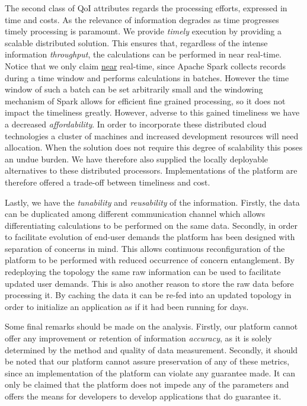 The second class of QoI attributes regards the processing efforts, expressed in time and costs. As the relevance of information degrades as time progresses timely processing is paramount. We provide \emph{timely} execution by providing a scalable distributed solution. This ensures that, regardless of the intense information \emph{throughput}, the calculations can be performed in near real-time. Notice that we only claim \underline{near} real-time, since Apache Spark collects records during a time window and performs calculations in batches. However the time window of such a batch can be set arbitrarily small and the windowing mechanism of Spark allows for efficient fine grained processing, so it does not impact the timeliness greatly. However, adverse to this gained timeliness we have a decreased \emph{affordability}. In order to incorporate these distributed cloud technologies a cluster of machines and increased development resources will need allocation. When the solution does not require this degree of scalability this poses an undue burden. We have therefore also supplied the locally deployable alternatives to these distributed processors. Implementations of the platform are therefore offered a trade-off between timeliness and cost.
	
Lastly, we have the \emph{tunability} and \emph{reusability} of the information. Firstly, the data can be duplicated among different communication channel which allows differentiating calculations to be performed on the same data. Secondly, in order to facilitate evolution of end-user demands the platform has been designed with separation of concerns in mind. This allows continuous reconfiguration of the platform to be performed with reduced occurrence of concern entanglement. By redeploying the topology the same raw information can be used to facilitate updated user demands. This is also another reason to store the raw data before processing it. By caching the data it can be re-fed into an updated topology in order to initialize an application as if it had been running for days.

Some final remarks should be made on the analysis. Firstly, our platform cannot offer any improvement or retention of information \emph{accuracy}, as it is solely determined by the method and quality of data measurement. Secondly, it should be noted that our platform cannot assure preservation of any of these metrics, since an implementation of the platform can violate any guarantee made. It can only be claimed that the platform does not impede any of the parameters and offers the means for developers to develop applications that do guarantee it.

